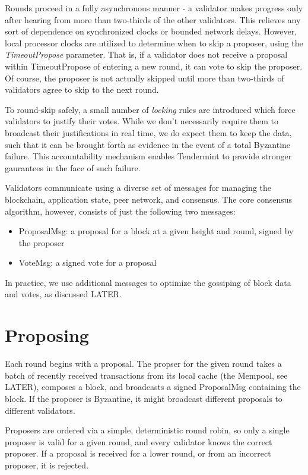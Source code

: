 Rounds proceed in a fully asynchronous manner - a validator makes progress only after hearing from more than two-thirds of the other validators.
This relieves any sort of dependence on synchronized clocks or bounded network delays.
However, local processor clocks are utilized to determine when to skip a proposer, using the \emph{TimeoutPropose} parameter.
That is, if a validator does not receive a proposal within TimeoutPropose of entering a new round, it can vote to skip the proposer.
Of course, the proposer is not actually skipped until more than two-thirds of validators agree to skip to the next round.

To round-skip safely, a small number of \emph{locking} rules are introduced which force validators to justify their votes.
While we don't necessarily require them to broadcast their justifications in real time, we do expect them to keep the data,
such that it can be brought forth as evidence in the event of a total Byzantine failure.
This accountability mechanism enables Tendermint to provide stronger gaurantees in the face of such failure.

Validators communicate using a diverse set of messages for managing the blockchain, application state, peer network, and consensus.
The core consensus algorithm, however, consists of just the following two messages:

\begin{itemize}
\item{ProposalMsg: a proposal for a block at a given height and round, signed by the proposer}
\item{VoteMsg: a signed vote for a proposal}
\end{itemize}

In practice, we use additional messages to optimize the gossiping of block data and votes, as discussed LATER.

\section{Proposing}

Each round begins with a proposal. 
The propser for the given round takes a batch of recently received transactions from its local cache (the Mempool, see LATER), 
composes a block, and broadcasts a signed ProposalMsg containing the block.
If the proposer is Byzantine, it might broadcast different proposals to different validators.

Proposers are ordered via a simple, deterministic round robin, 
so only a single proposer is valid for a given round, 
and every validator knows the correct proposer. 
If a proposal is received for a lower round, or from an incorrect proposer, it is rejected.

